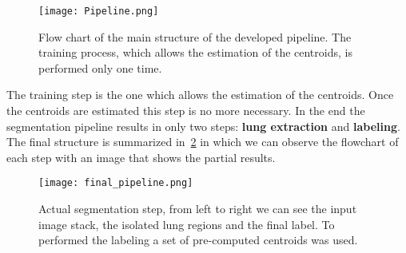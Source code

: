 \documentclass{standalone}
\begin{document}
	
	\begin{figure}[h!]
		\centering 
		\texttt{[image: Pipeline.png]}
		\caption{Flow chart of the main structure of the developed pipeline. The training process, which allows the estimation of the centroids, is performed only one time.}\label{fig:Pipeline}
	\end{figure} 
	
	
	The training step is the one which allows the estimation of the centroids. Once the centroids are estimated this step is no more necessary. 
	In the end the segmentation pipeline results in only two steps: \textbf{lung extraction} and \textbf{labeling}. The final structure is summarized in \figurename\,\ref{fig:FinalPipeline} in which we can observe the flowchart of each step with an image that shows the partial results.
	
	\begin{figure}
		\centering
		\texttt{[image: final\_pipeline.png]}
		\caption{Actual segmentation step, from left to right we can see the input image stack, the isolated lung regions and the final label. To performed the labeling a set of pre-computed centroids was used.}\label{fig:FinalPipeline}
	\end{figure}
\end{document}
